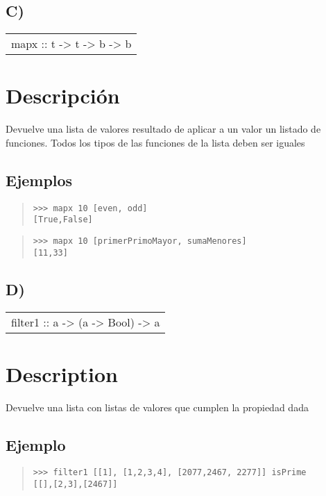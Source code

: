 \subsection{C)}
\begin{haddockdesc}
\item[\begin{tabular}{@{}l}
mapx :: t -> {\char 91}t -> b{\char 93} -> {\char 91}b{\char 93}
\end{tabular}]
{\haddockbegindoc
\section*{Descripción}
Devuelve una lista de valores resultado de aplicar a un valor un listado de funciones. Todos los tipos de las funciones de la lista deben ser iguales\par
\subsection*{Ejemplos}
\begin{quote}
{\haddockverb\begin{verbatim}
>>> mapx 10 [even, odd]
[True,False]

\end{verbatim}}
\end{quote}
\begin{quote}
{\haddockverb\begin{verbatim}
>>> mapx 10 [primerPrimoMayor, sumaMenores]
[11,33]

\end{verbatim}}
\end{quote}}
\end{haddockdesc}
\subsection{D)}
\begin{haddockdesc}
\item[\begin{tabular}{@{}l}
filter1 :: {\char 91}{\char 91}a{\char 93}{\char 93} -> (a -> Bool) -> {\char 91}{\char 91}a{\char 93}{\char 93}
\end{tabular}]
{\haddockbegindoc
\section*{Description}
Devuelve una lista con listas de valores que cumplen la propiedad dada\par
\subsection*{Ejemplo}
\begin{quote}
{\haddockverb\begin{verbatim}
>>> filter1 [[1], [1,2,3,4], [2077,2467, 2277]] isPrime
[[],[2,3],[2467]]

\end{verbatim}}
\end{quote}}
\end{haddockdesc}
